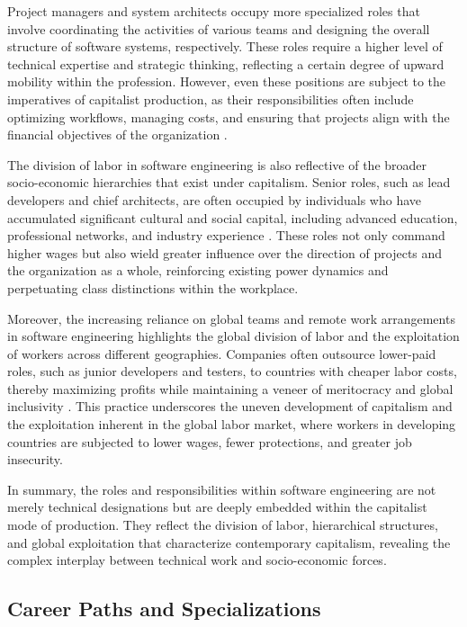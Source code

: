 \begin{refsection}
Project managers and system architects occupy more specialized roles that involve coordinating the activities of various teams and designing the overall structure of software systems, respectively. These roles require a higher level of technical expertise and strategic thinking, reflecting a certain degree of upward mobility within the profession. However, even these positions are subject to the imperatives of capitalist production, as their responsibilities often include optimizing workflows, managing costs, and ensuring that projects align with the financial objectives of the organization \cite[pp.~96-99]{engels1987condition}.

The division of labor in software engineering is also reflective of the broader socio-economic hierarchies that exist under capitalism. Senior roles, such as lead developers and chief architects, are often occupied by individuals who have accumulated significant cultural and social capital, including advanced education, professional networks, and industry experience \cite[pp.~142-145]{braverman1974labor}. These roles not only command higher wages but also wield greater influence over the direction of projects and the organization as a whole, reinforcing existing power dynamics and perpetuating class distinctions within the workplace.

Moreover, the increasing reliance on global teams and remote work arrangements in software engineering highlights the global division of labor and the exploitation of workers across different geographies. Companies often outsource lower-paid roles, such as junior developers and testers, to countries with cheaper labor costs, thereby maximizing profits while maintaining a veneer of meritocracy and global inclusivity \cite[pp.~74-78]{marx2008capital}. This practice underscores the uneven development of capitalism and the exploitation inherent in the global labor market, where workers in developing countries are subjected to lower wages, fewer protections, and greater job insecurity.

In summary, the roles and responsibilities within software engineering are not merely technical designations but are deeply embedded within the capitalist mode of production. They reflect the division of labor, hierarchical structures, and global exploitation that characterize contemporary capitalism, revealing the complex interplay between technical work and socio-economic forces.

\subsection{Career Paths and Specializations}


\end{refsection}
